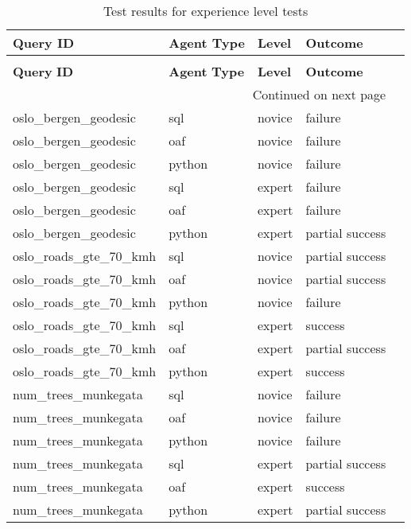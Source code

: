 \begin{longtable}{lp{1.8cm}p{1.8cm}p{1.8cm}p{2.5cm}}
\caption{Test results for experience level tests} \label{tbl:test-results-prompt-levels} \\
\toprule
\textbf{Query} \textbf{ID} & \textbf{Agent} \textbf{Type} & \textbf{Level} & \textbf{Outcome} \\
\midrule
\endfirsthead
\caption[]{Test results for experience level tests} \\
\toprule
\textbf{Query} \textbf{ID} & \textbf{Agent} \textbf{Type} & \textbf{Level} & \textbf{Outcome} \\
\midrule
\endhead
\midrule
\multicolumn{4}{r}{Continued on next page} \\
\midrule
\endfoot
\bottomrule
\endlastfoot
oslo\_bergen\_geodesic & sql  & novice & failure \\
oslo\_bergen\_geodesic & oaf & novice & failure \\
oslo\_bergen\_geodesic & python & novice & failure \\
oslo\_bergen\_geodesic & sql  & expert & failure \\
oslo\_bergen\_geodesic & oaf & expert & failure \\
oslo\_bergen\_geodesic & python & expert & partial success \\
oslo\_roads\_gte\_70\_kmh & sql  & novice & partial success \\
oslo\_roads\_gte\_70\_kmh & oaf & novice & partial success \\
oslo\_roads\_gte\_70\_kmh & python & novice & failure \\
oslo\_roads\_gte\_70\_kmh & sql  & expert & success \\
oslo\_roads\_gte\_70\_kmh & oaf & expert & partial success \\
oslo\_roads\_gte\_70\_kmh & python & expert & success \\
num\_trees\_munkegata & sql  & novice & failure \\
num\_trees\_munkegata & oaf & novice & failure \\
num\_trees\_munkegata & python & novice & failure \\
num\_trees\_munkegata & sql  & expert & partial success \\
num\_trees\_munkegata & oaf & expert & success \\
num\_trees\_munkegata & python & expert & partial success \\
\end{longtable}
